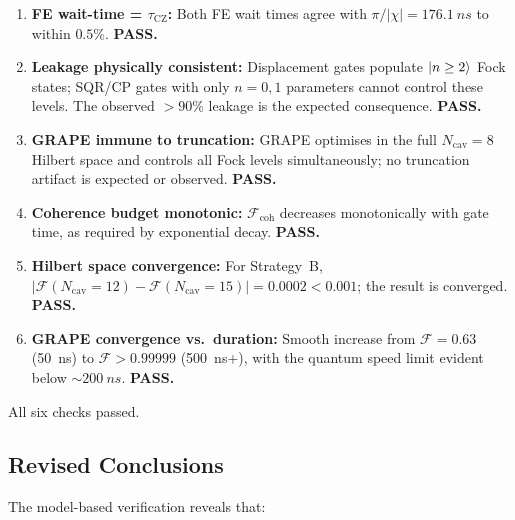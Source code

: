 \documentclass[aps,pra,twocolumn,reprint,floatfix,amsmath,amssymb]{revtex4-2}
\begin{document}
\begin{enumerate}
  \item \textbf{FE wait-time = $\tau_\mathrm{CZ}$:}
    Both FE wait times agree with $\pi/|\chi|=\SI{176.1}{ns}$
    to within $0.5\%$.  \textbf{PASS.}

  \item \textbf{Leakage physically consistent:}
    Displacement gates populate $\ket{n\geq 2}$ Fock states;
    SQR/CP gates with only $n=0,1$ parameters cannot control
    these levels.  The observed $>90\%$ leakage is the expected
    consequence.  \textbf{PASS.}

  \item \textbf{GRAPE immune to truncation:}
    GRAPE optimises in the full $N_\mathrm{cav}=8$ Hilbert space
    and controls all Fock levels simultaneously; no truncation
    artifact is expected or observed.  \textbf{PASS.}

  \item \textbf{Coherence budget monotonic:}
    $\mathcal{F}_\mathrm{coh}$ decreases monotonically with gate
    time, as required by exponential decay.  \textbf{PASS.}

  \item \textbf{Hilbert space convergence:}
    For Strategy~B, $|\mathcal{F}(N_\mathrm{cav}{=}12) -
    \mathcal{F}(N_\mathrm{cav}{=}15)| = 0.0002 < 0.001$;
    the result is converged.  \textbf{PASS.}

  \item \textbf{GRAPE convergence vs.\ duration:}
    Smooth increase from $\mathcal{F}=0.63$ (\SI{50}{ns}) to
    $\mathcal{F}>0.99999$ (\SI{500}{ns}+), with the quantum speed
    limit evident below $\sim\SI{200}{ns}$.  \textbf{PASS.}
\end{enumerate}

All six checks passed.

\subsection{Revised Conclusions}
\label{sec:iter3_conclusions}

The model-based verification reveals that:
\end{document}
